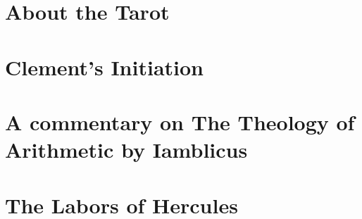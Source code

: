 \documentclass[a4paper,12pt,twoside]{book}
\begin{document}
\chapter{About the Tarot}








\chapter{Clement's Initiation}









\chapter[The Theology of Arithmetic]{A commentary on The Theology of Arithmetic by Iamblicus}
















\chapter{The Labors of Hercules}












\end{document}

